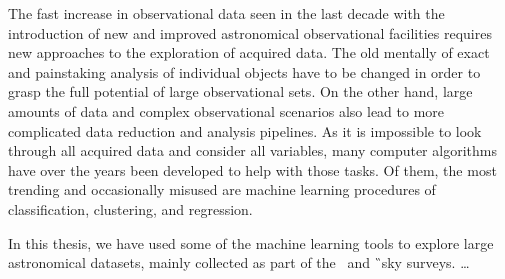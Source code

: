 The fast increase in observational data seen in the last decade with the introduction of new and improved astronomical observational facilities requires new approaches to the exploration of acquired data. The old mentally of exact and painstaking analysis of individual objects have to be changed in order to grasp the full potential of large observational sets. On the other hand, large amounts of data and complex observational scenarios also lead to more complicated data reduction and analysis pipelines. As it is impossible to look through all acquired data and consider all variables, many computer algorithms have over the years been developed to help with those tasks. Of them, the most trending and occasionally misused are machine learning procedures of classification, clustering, and regression.

In this thesis, we have used some of the machine learning tools to explore large astronomical datasets, mainly collected as part of the \Gh\ and \G\ sky surveys. \ldots